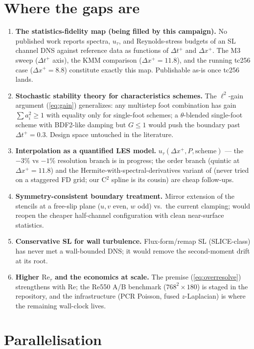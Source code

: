 \documentclass[11pt,a4paper]{article}
\newcommand{\ut}{u_\tau}
\newcommand{\Ret}{\mathrm{Re}_\tau}
\newcommand{\dtp}{\Delta t^{+}}
\begin{document}
\section{Where the gaps are}

\begin{enumerate}
\item \textbf{The statistics-fidelity map (being filled by this campaign).}
No published work reports spectra, $\ut$, and Reynolds-stress budgets of an
SL channel DNS against reference data as functions of $\dtp$ and
$\Delta x^{+}$. The M3 sweep ($\dtp$ axis), the KMM comparison
($\Delta x^{+}=11.8$), and the running tc256 case ($\Delta x^{+}=8.8$)
constitute exactly this map. Publishable as-is once tc256 lands.
\item \textbf{Stochastic stability theory for characteristics schemes.} The
$\ell^2$-gain argument (\ref{eq:gain}) generalizes: any multistep foot
combination has gain $\sum a_i^2 \ge 1$ with equality only for single-foot
schemes; a $\theta$-blended single-foot scheme with BDF2-like damping but
$G\le1$ would push the boundary past $\dtp=0.3$. Design space untouched in
the literature.
\item \textbf{Interpolation as a quantified LES model.} $\ut(\Delta
x^{+}, P, \text{scheme})$ --- the $-3\%$ vs $-1\%$ resolution branch is in
progress; the order branch (quintic at $\Delta x^{+}=11.8$) and the
Hermite-with-spectral-derivatives variant of \cite{xiu05} (never tried on a
staggered FD grid; our C$^2$ spline is its cousin) are cheap follow-ups.
\item \textbf{Symmetry-consistent boundary treatment.} Mirror extension of
the stencils at a free-slip plane ($u,v$ even, $w$ odd) vs.\ the current
clamping; would reopen the cheaper half-channel configuration with clean
near-surface statistics.
\item \textbf{Conservative SL for wall turbulence.} Flux-form/remap SL
(SLICE-class) has never met a wall-bounded DNS; it would remove the
second-moment drift at its root.
\item \textbf{Higher $\Ret$ and the economics at scale.} The premise
(\ref{eq:overresolve}) strengthens with $\mathrm{Re}$; the Re550 A/B
benchmark ($768^2\times180$) is staged in the repository, and the
infrastructure (PCR Poisson, fused $z$-Laplacian) is where the remaining
wall-clock lives.
\end{enumerate}

\section{Parallelisation}
\label{sec:parallel}
\end{document}
